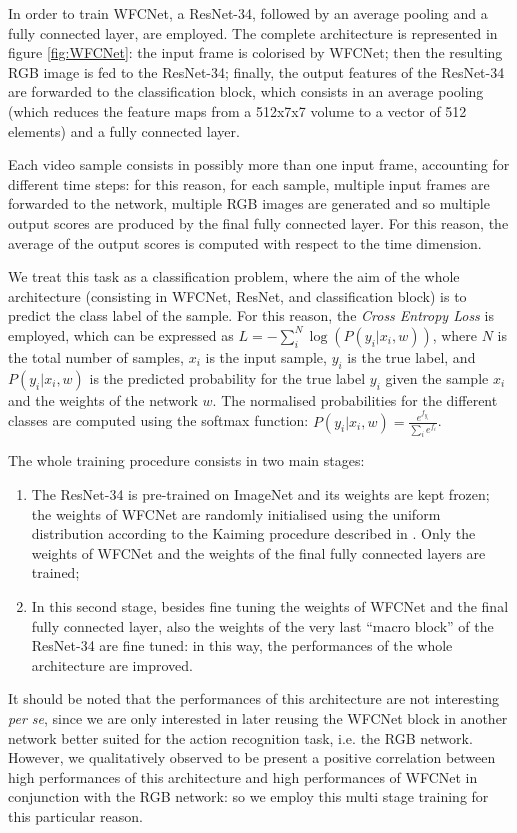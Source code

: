 \documentclass[10pt,twocolumn,letterpaper]{article}
\begin{document}
In order to train WFCNet, a ResNet-34, followed by an average pooling and a fully connected layer, are employed. The complete architecture is represented in figure \ref{fig:WFCNet}: the input frame is colorised by WFCNet; then the resulting RGB image is fed to the ResNet-34; finally, the output features of the ResNet-34 are forwarded to the classification block, which consists in an average pooling (which reduces the feature maps from a 512x7x7 volume to a vector of 512 elements) and a fully connected layer.

Each video sample consists in possibly more than one input frame, accounting for different time steps: for this reason, for each sample, multiple input frames are forwarded to the network, multiple RGB images are generated and so multiple output scores are produced by the final fully connected layer. For this reason, the average of the output scores is computed with respect to the time dimension.

We treat this task as a classification problem, where the aim of the whole architecture (consisting in WFCNet, ResNet, and classification block) is to predict the class label of the sample. For this reason, the \textit{Cross Entropy Loss} is employed, which can be expressed as ${L = -\sum_i^N{\log(P(y_i | x_i, w))}}$, where $N$ is the total number of samples, $x_i$ is the input sample, $y_i$ is the true label, and ${P(y_i | x_i, w)}$ is the predicted probability for the true label $y_i$ given the sample $x_i$ and the weights of the network $w$. The normalised probabilities for the different classes are computed using the softmax function: ${P(y_i | x_i, w) = \frac{e^{f_{y_i}}}{\sum_i e^{f_i}}}$.

The whole training procedure consists in two main stages:
\begin{enumerate}
	\item The ResNet-34 is pre-trained on ImageNet and its weights are kept frozen; the weights of WFCNet are randomly initialised using the uniform distribution according to the Kaiming procedure described in \cite{he2015delving}. Only the weights of WFCNet and the weights of the final fully connected layers are trained;
	\item In this second stage, besides fine tuning the weights of WFCNet and the final fully connected layer, also the weights of the very last ``macro block'' of the ResNet-34 are fine tuned: in this way, the performances of the whole architecture are improved.
\end{enumerate}
It should be noted that the performances of this architecture are not interesting \textit{per se}, since we are only interested in later reusing the WFCNet block in another network better suited for the action recognition task, i.e. the RGB network. However, we qualitatively observed to be present a positive correlation between high performances of this architecture and high performances of WFCNet in conjunction with the RGB network: so we employ this multi stage training for this particular reason.
\end{document}
